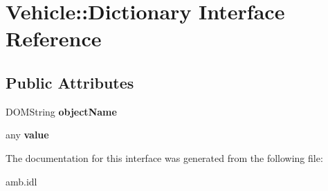 \hypertarget{interfaceVehicle_1_1Dictionary}{\section{Vehicle\-:\-:Dictionary Interface Reference}
\label{interfaceVehicle_1_1Dictionary}
}
\subsection*{Public Attributes}
\begin{DoxyCompactItemize}
\item 
\hypertarget{interfaceVehicle_1_1Dictionary_aed28f6c8a85e0963393e58e048c99038}{D\-O\-M\-String {\bfseries object\-Name}}\label{interfaceVehicle_1_1Dictionary_aed28f6c8a85e0963393e58e048c99038}

\item 
\hypertarget{interfaceVehicle_1_1Dictionary_a154c366d844a2fbb69daa637950a6d5d}{any {\bfseries value}}\label{interfaceVehicle_1_1Dictionary_a154c366d844a2fbb69daa637950a6d5d}

\end{DoxyCompactItemize}


The documentation for this interface was generated from the following file\-:\begin{DoxyCompactItemize}
\item 
amb.\-idl\end{DoxyCompactItemize}
